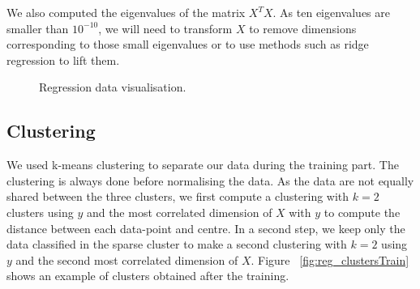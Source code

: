 \documentclass{article} %
\begin{document}
We also computed the eigenvalues of the matrix $X^T X$. As ten eigenvalues are smaller than $10^{-10}$, we will need to transform $X$ to remove dimensions corresponding to those small eigenvalues or to use methods such as ridge regression to lift them. 

\begin{figure}[!h] %
\center
{}
\hfill
{}
\hfill
{}
\caption{Regression data visualisation.}
\end{figure}

\subsection{Clustering}
We used k-means clustering to separate our data during the training part. The clustering is always done before normalising the data.
As the data are not equally shared between the three clusters, we first compute a clustering with $k=2$ clusters using $y$ and the most correlated dimension of $X$ with $y$ to compute the distance between each data-point and centre. In a second step, we keep only the data classified in the sparse cluster to make a second clustering with $k=2$ using $y$ and the second most correlated dimension of $X$. Figure ~\ref{fig:reg_clustersTrain} shows an example of clusters obtained after the training.
\end{document}

